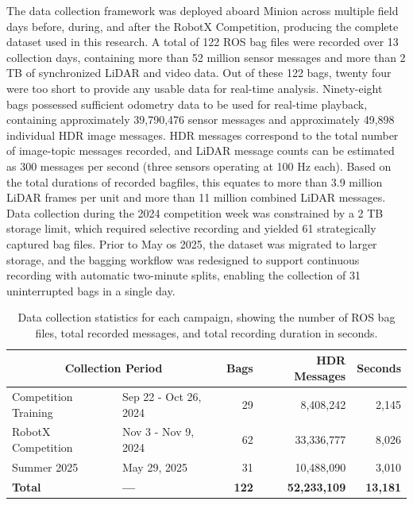 \documentclass{erauthesis}
\begin{document}
The data collection framework was deployed aboard Minion across multiple field days before, during, and after the RobotX Competition, producing the complete dataset used in this research.
A total of 122 ROS bag files were recorded over 13 collection days, containing more than 52 million sensor messages and more than 2 TB of synchronized LiDAR and video data. Out of these 122 bags, twenty four were too short to provide any usable data for real-time analysis.
Ninety-eight bags possessed sufficient odometry data to be used for real-time playback, containing approximately 39,790,476 sensor messages and approximately 49,898 individual \ac{HDR} image messages.
HDR messages correspond to the total number of image-topic messages recorded, and LiDAR message counts can be estimated as 300 messages per second (three sensors operating at 100 Hz each).
Based on the total durations of recorded bagfiles, this equates to more than 3.9 million LiDAR frames per unit and more than 11 million combined LiDAR messages.
Data collection during the 2024 competition week was constrained by a 2 TB storage limit, which required selective recording and yielded 61 strategically captured bag files. Prior to May os 2025, the dataset was migrated to larger storage, and the bagging workflow was redesigned to support continuous recording with automatic two-minute splits, enabling the collection of 31 uninterrupted bags in a single day.

\begin{table}[htbp]
\centering
\begin{tabular}{llrrr}
\hline
\multicolumn{2}{c}{Collection Period} & Bags & HDR Messages & Seconds \\
\hline
\hline
Competition Training & Sep 22 - Oct 26, 2024 & 29 & 8,408,242 & 2,145 \\
RobotX Competition & Nov 3 - Nov 9, 2024 & 62 & 33,336,777 & 8,026 \\
Summer 2025  & May 29, 2025 & 31 & 10,488,090 & 3,010 \\
\hline
\textbf{Total} & \textbf{---} & \textbf{122} & \textbf{52,233,109} & \textbf{13,181} \\
\hline
\end{tabular}
\caption{Data collection statistics for each campaign, showing the number of ROS bag files, total recorded messages, and total recording duration in seconds.}
\label{tab:rosbag_stats}
\end{table}
\end{document}
